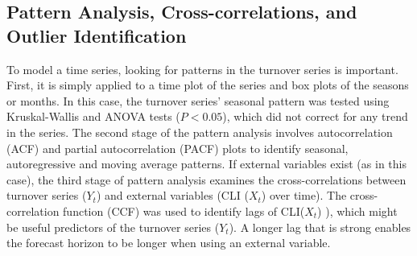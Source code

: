 \subsection{Pattern Analysis, Cross-correlations, and Outlier Identification}
 To model a time series, looking for patterns in the turnover series is important. First, it is simply applied to a time plot of the series and box plots of the seasons or months. In this case, the turnover series' seasonal pattern was tested using Kruskal-Wallis and ANOVA tests ($P<0.05$), which did not correct for any trend in the series. The second stage of the pattern analysis involves autocorrelation (ACF) and partial autocorrelation (PACF) plots to identify seasonal, autoregressive and moving average patterns. If external variables exist (as in this case), the third stage of pattern analysis examines the cross-correlations between turnover series ($Y_t$) and external variables (CLI ($X_t$) over time). The cross-correlation function (CCF) was used to identify lags of CLI($X_t$) ), which might be useful predictors of the turnover series ($Y_t$).  A longer lag that is strong enables the forecast horizon to be longer when using an external variable.

